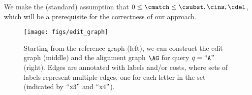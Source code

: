 We make the (standard) assumption that $0 \leq \cmatch \leq \csubst, \cins,
\cdel$, which will be a prerequisite for the correctness of our approach.

\begin{figure}[t]
	\centering
	\texttt{[image: figs/edit\_graph]}
	\caption[Constructing the alignment graph.]{Starting from the reference graph (left), we can construct the edit graph (middle) and the alignment graph $\AG$ for query $q=``\texttt{A}"$ (right). Edges are annotated with labels and/or costs, where sets of labels represent multiple edges, one for each letter in the set (indicated by $``\text{x}3"$ and $``\text{x}4"$).}
	\label{TRIEfig:graph-constructions}
\end{figure}


